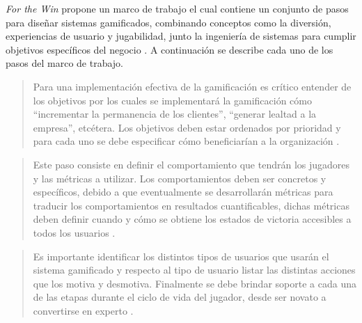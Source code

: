  {\it For the Win} propone un marco de trabajo el cual contiene un conjunto de pasos para diseñar
 sistemas gamificados, combinando conceptos como la diversión, experiencias de usuario y jugabilidad,
 junto la ingeniería de sistemas para cumplir objetivos específicos del negocio
 \cite[p. 70]{ForTheWin}. A continuación se describe cada uno de los pasos del marco de trabajo.\\


    \begin{quote}
        Para una implementación efectiva de la gamificación es crítico entender de los
        objetivos por los cuales se implementará la gamificación cómo ``incrementar la
        permanencia de los clientes'', ``generar lealtad a la empresa'', etcétera. Los
        objetivos deben estar ordenados por prioridad y para cada uno se debe especificar
        cómo beneficiarían a la organización \cite[p. 62]{ForTheWin}.
    \end{quote}



    \begin{quote}
        Este paso consiste en definir el comportamiento que tendrán los jugadores y las
        métricas a utilizar. Los comportamientos deben ser concretos y específicos,
        debido a que eventualmente se desarrollarán métricas para traducir los comportamientos
        en resultados cuantificables, dichas métricas deben definir cuando y cómo se obtiene
        los estados de victoria accesibles a todos los usuarios \cite[pp. 63-64]{ForTheWin}.
    \end{quote}



    \begin{quote}
        Es importante identificar los distintos tipos de usuarios que usarán el sistema
        gamificado y respecto al tipo de usuario listar las distintas acciones que los
        motiva y desmotiva. Finalmente se debe brindar soporte a cada una de las etapas
        durante el ciclo de vida del jugador, desde ser novato a convertirse en experto
        \cite[pp. 64-65]{ForTheWin}.
    \end{quote}


